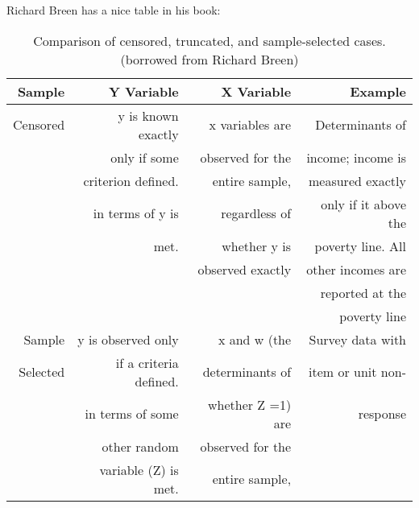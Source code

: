 Richard Breen has a nice table in his book:


\begin{table}[htbp]\centering
 \caption{Comparison of censored, truncated, and sample-selected
 cases. (borrowed from Richard Breen)
\label{tabresult intreg}}


\begin{tabular}{rrrr}

   Sample  & Y Variable  & X Variable  &   Example  \\
\hline


 Censored  & y is known exactly  & x variables are  & Determinants of  \\

           & only if some  & observed for the  & income; income is  \\

           & criterion defined.  & entire sample,  & measured exactly  \\

           & in terms of y is  & regardless of  & only if it above the  \\

           &      met.  & whether y is  & poverty line. All  \\

           &            & observed exactly  & other incomes are  \\

           &            &            & reported at the  \\

           &            &            & poverty line  \\
 \hline

   Sample & y is observed only  & x and w (the  & Survey data with  \\

 Selected  & if a criteria defined.  & determinants of  & item or unit non- \\

           & in terms of some  & whether Z =1) are  &  response  \\

           & other random  & observed for the  &            \\

           & variable (Z) is met.  & entire sample,  &            \\


\end{tabular}
\end{table}
